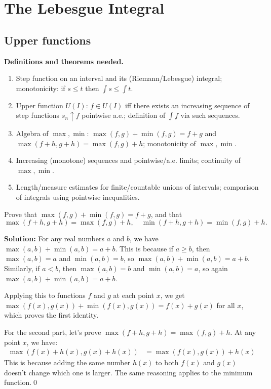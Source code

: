 \chapter{The Lebesgue Integral}

\section{Upper functions}

\noindent\textbf{Definitions and theorems needed.}
\begin{enumerate}[label=(\alph*)]
    \item Step function on an interval and its (Riemann/Lebesgue) integral; monotonicity: if $s\le t$ then $\int s\le\int t$.
    \item Upper function $U(I)$: $f\in U(I)$ iff there exists an increasing sequence of step functions $s_n\uparrow f$ pointwise a.e.; definition of $\int f$ via such sequences.
    \item Algebra of $\max,\min$: $\max(f,g)+\min(f,g)=f+g$ and $\max(f+h,g+h)=\max(f,g)+h$; monotonicity of $\max,\min$.
    \item Increasing (monotone) sequences and pointwise/a.e. limits; continuity of $\max,\min$.
    \item Length/measure estimates for finite/countable unions of intervals; comparison of integrals using pointwise inequalities.
\end{enumerate}



\begin{problembox}
Prove that $\max(f, g) + \min(f, g) = f + g$, and that 
\[ \max(f + h, g + h) = \max(f, g) + h, \quad \min(f + h, g + h) = \min(f, g) + h. \]
\end{problembox}

\noindent\textbf{Solution:}
For any real numbers $a$ and $b$, we have $\max(a, b) + \min(a, b) = a + b$. This is because if $a \geq b$, then $\max(a, b) = a$ and $\min(a, b) = b$, so $\max(a, b) + \min(a, b) = a + b$. Similarly, if $a < b$, then $\max(a, b) = b$ and $\min(a, b) = a$, so again $\max(a, b) + \min(a, b) = a + b$.

Applying this to functions $f$ and $g$ at each point $x$, we get $\max(f(x), g(x)) + \min(f(x), g(x)) = f(x) + g(x)$ for all $x$, which proves the first identity.

For the second part, let's prove $\max(f + h, g + h) = \max(f, g) + h$. At any point $x$, we have:
\begin{align*}
\max(f(x) + h(x), g(x) + h(x)) &= \max(f(x), g(x)) + h(x)
\end{align*}
This is because adding the same number $h(x)$ to both $f(x)$ and $g(x)$ doesn't change which one is larger. The same reasoning applies to the minimum function.\qed


